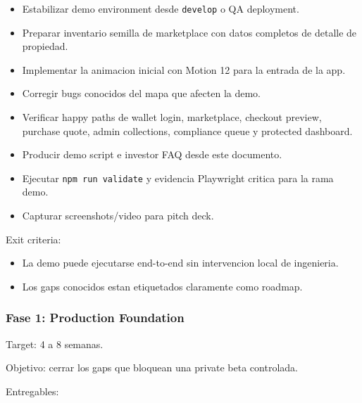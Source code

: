 \documentclass[
  10pt,
  letterpaper,
]{article}
\providecommand{\tightlist}{%
  \setlength{\itemsep}{0pt}\setlength{\parskip}{0pt}}
\let\oldtexttt\texttt
\renewcommand{\texttt}[1]{\oldtexttt{\small #1}}
\begin{document}
\begin{itemize}
\tightlist
\item
  Estabilizar demo environment desde \texttt{develop} o QA deployment.
\item
  Preparar inventario semilla de marketplace con datos completos de
  detalle de propiedad.
\item
  Implementar la animacion inicial con Motion 12 para la entrada de la
  app.
\item
  Corregir bugs conocidos del mapa que afecten la demo.
\item
  Verificar happy paths de wallet login, marketplace, checkout preview,
  purchase quote, admin collections, compliance queue y protected
  dashboard.
\item
  Producir demo script e investor FAQ desde este documento.
\item
  Ejecutar \texttt{npm\ run\ validate} y evidencia Playwright critica
  para la rama demo.
\item
  Capturar screenshots/video para pitch deck.
\end{itemize}

Exit criteria:

\begin{itemize}
\tightlist
\item
  La demo puede ejecutarse end-to-end sin intervencion local de
  ingenieria.
\item
  Los gaps conocidos estan etiquetados claramente como roadmap.
\end{itemize}

\subsubsection{Fase 1: Production
Foundation}\label{fase-1-production-foundation}

Target: 4 a 8 semanas.

Objetivo: cerrar los gaps que bloquean una private beta controlada.

Entregables:
\end{document}
